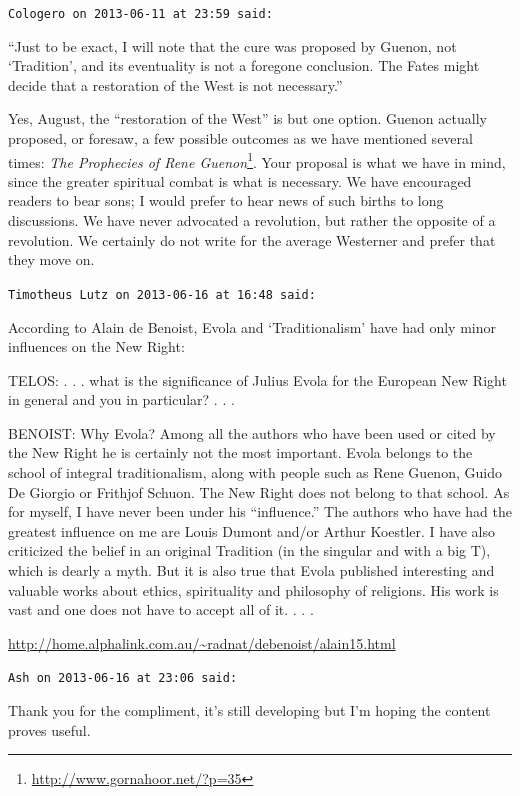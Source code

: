 \begin{footnotesize}
\begin{sffamily}
\hfill

\texttt{Cologero on 2013-06-11 at 23:59 said:}

``Just to be exact, I will note that the cure was proposed by Guenon, not `Tradition', and its eventuality is not a foregone conclusion. The Fates might decide that a restoration of the West is not necessary.''

Yes, August, the ``restoration of the West'' is but one option. Guenon actually proposed, or foresaw, a few possible outcomes as we have mentioned several times: \textit{The Prophecies of Rene Guenon}\footnote{\url{http://www.gornahoor.net/?p=35}}. Your proposal is what we have in mind, since the greater spiritual combat is what is necessary. We have encouraged readers to bear sons; I would prefer to hear news of such births to long discussions. We have never advocated a revolution, but rather the opposite of a revolution. We certainly do not write for the average Westerner and prefer that they move on.

\hfill

\texttt{Timotheus Lutz on 2013-06-16 at 16:48 said:}

According to Alain de Benoist, Evola and `Traditionalism' have had only minor influences on the New Right:

TELOS: . . . what is the significance of Julius Evola for the European New Right in general and you in particular? . . . 

BENOIST: Why Evola? Among all the authors who have been used or cited by the New Right he is certainly not the most important. Evola belongs to the school of integral traditionalism, along with people such as Rene Guenon, Guido De Giorgio or Frithjof Schuon. The New Right does not belong to that school. As for myself, I have never been under his ``influence.'' The authors who have had the greatest influence on me are Louis Dumont and/or Arthur Koestler. I have also criticized the belief in an original Tradition (in the singular and with a big T), which is dearly a myth. But it is also true that Evola published interesting and valuable works about ethics, spirituality and philosophy of religions. His work is vast and one does not have to accept all of it. . . .

\url{http://home.alphalink.com.au/\~radnat/debenoist/alain15.html}


\hfill

\texttt{Ash on 2013-06-16 at 23:06 said:}

Thank you for the compliment, it's still developing but I'm hoping the content proves useful.


\end{sffamily}
\end{footnotesize}
